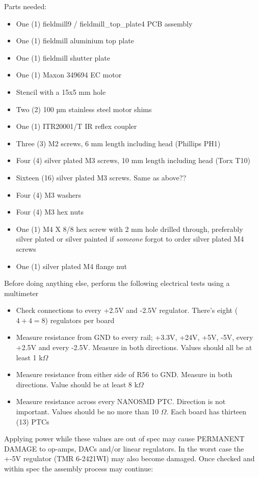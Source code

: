 \documentclass{article}
\begin{document}
Parts needed:

\begin{itemize}
\item One (1) fieldmill9 / fieldmill\_top\_plate4 PCB assembly
\item One (1) fieldmill aluminium top plate
\item One (1) fieldmill shutter plate
\item One (1) Maxon 349694 EC motor
\item Stencil with a 15x5 mm hole
\item Two (2) 100 µm stainless steel motor shims
\item One (1) ITR20001/T IR reflex coupler
\item Three (3) M2 screws, 6 mm length including head (Phillips PH1)
\item Four (4) silver plated M3 screws, 10 mm length including head (Torx T10)
\item Sixteen (16) silver plated M3 screws. Same as above??
\item Four (4) M3 washers
\item Four (4) M3 hex nuts
\item One (1) M4 X 8/8 hex screw with 2 mm hole drilled through, preferably silver plated or silver painted if {\it someone} forgot to order silver plated M4 screws
\item One (1) silver plated M4 flange nut
\end{itemize}

Before doing anything else, perform the following electrical tests using a multimeter

\begin{itemize}
\item Check connections to every +2.5V and -2.5V regulator. There's eight ($4 + 4 = 8$) regulators per board
\item Measure resistance from GND to every rail; +3.3V, +24V, +5V, -5V, every +2.5V and every -2.5V. Measure in both directions. Values should all be at least 1 k$\Omega$
\item Measure resistance from either side of R56 to GND. Measure in both directions. Value should be at least 8 k$\Omega$
\item Measure resistance across every NANOSMD PTC. Direction is not important. Values should be no more than 10 $\Omega$. Each board has thirteen (13) PTCs
\end{itemize}

Applying power while these values are out of spec may cause PERMANENT DAMAGE to op-amps, DACs and/or linear regulators.
In the worst case the +-5V regulator (TMR 6-2421WI) may also become damaged.
Once checked and within spec the assembly process may continue:
\end{document}
